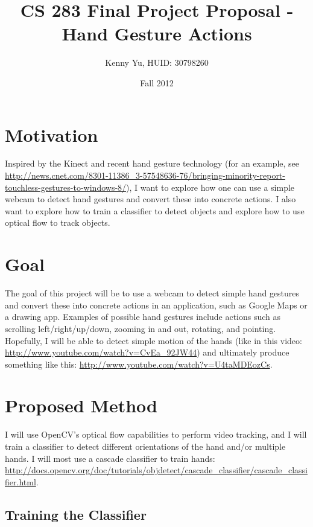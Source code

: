 \documentclass[12pt]{article}
\begin{document}
\title{CS 283 Final Project Proposal - Hand Gesture Actions}
\date{Fall 2012}
\author{Kenny Yu, HUID: 30798260}

\maketitle

\section{Motivation}
Inspired by the Kinect and recent hand gesture technology (for an example, see \url{http://news.cnet.com/8301-11386_3-57548636-76/bringing-minority-report-touchless-gestures-to-windows-8/}), I want to explore how one can use a simple webcam to detect hand gestures and convert these into concrete actions. I also want to explore how to train a classifier to detect objects and explore how to use optical flow to track objects.

\section{Goal}
The goal of this project will be to use a webcam to detect simple hand gestures and convert these into concrete actions in an application, such as Google Maps or a drawing app. Examples of possible hand gestures include actions such as scrolling left/right/up/down, zooming in and out, rotating, and pointing. Hopefully, I will be able to detect simple motion of the hands (like in this video: \url{http://www.youtube.com/watch?v=CvEa_92JW44}) and ultimately produce something like this: \url{http://www.youtube.com/watch?v=U4taMDEozCs}.

\section{Proposed Method}
I will use OpenCV's optical flow capabilities to perform video tracking, and I will train a classifier to detect different orientations of the hand and/or multiple hands. I will most use a cascade classifier to train hands: \url{http://docs.opencv.org/doc/tutorials/objdetect/cascade_classifier/cascade_classifier.html}. 

\subsection{Training the Classifier}
\end{document}
